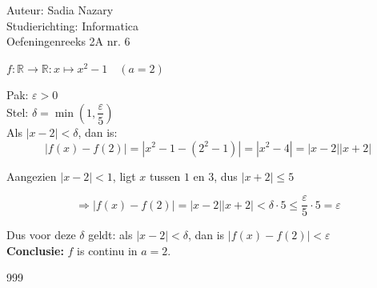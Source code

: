 \documentclass[a4paper]{article}
\newcommand{\R}{\mathbb{R}}
\begin{document}
  
\noindent \large Auteur: Sadia Nazary \\
\noindent \large Studierichting: Informatica\\
\noindent \large Oefeningenreeks 2A nr. 6\\

\medskip

\normalsize

$f:\R\rightarrow\R:x\mapsto x^2 - 1 \quad (a = 2)$

\medskip

Pak: $\varepsilon > 0$\\

Stel: $\delta = \min\left(1, \dfrac{\varepsilon}{5}\right)$\\

Als $|x - 2| < \delta$, dan is:\\

\[
|f(x) - f(2)| = |x^2 - 1 - (2^2 - 1)| = |x^2 - 4| = |x - 2||x + 2|
\]

Aangezien $|x - 2| < 1$, ligt $x$ tussen $1$ en $3$, dus $|x + 2| \leq 5$

\[
\Rightarrow |f(x) - f(2)| = |x - 2||x + 2| < \delta \cdot 5 \leq \dfrac{\varepsilon}{5} \cdot 5 = \varepsilon
\]

Dus voor deze $\delta$ geldt: als $|x - 2| < \delta$, dan is $|f(x) - f(2)| < \varepsilon$\\

\textbf{Conclusie:} $f$ is continu in $a = 2$.

\begin{thebibliography}{999}
\end{thebibliography}
\end{document}
